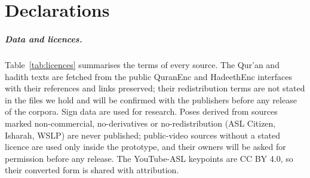 \chapter{Declarations}
\label{sec:statements}

\paragraph{Data and licences.} Table~\ref{tab:licences} summarises the terms of every source. The Qur'an and hadith texts
are fetched from the public QuranEnc and HadeethEnc interfaces with their references and links preserved; their
redistribution terms are not stated in the files we hold and will be confirmed with the publishers before any release
of the corpora. Sign data are used for research. Poses derived from sources marked non-commercial, no-derivatives or
no-redistribution (ASL Citizen, Isharah, WSLP) are never published; public-video sources without a stated licence are
used only inside the prototype, and their owners will be asked for permission before any release. The YouTube-ASL
keypoints are CC BY 4.0, so their converted form is shared with attribution.

